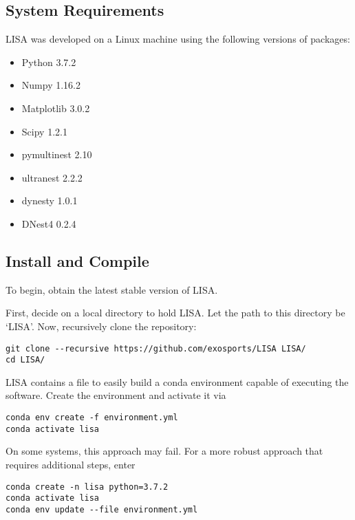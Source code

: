 \documentclass[letterpaper, 12pt]{article}
\begin{document}
\subsection{System Requirements}
\label{sec:requirements}

\noindent LISA was developed on a Linux machine using the following 
versions of packages:

\begin{itemize}
\item Python 3.7.2
\item Numpy 1.16.2
\item Matplotlib 3.0.2
\item Scipy 1.2.1
\item pymultinest 2.10
\item ultranest 2.2.2
\item dynesty 1.0.1
\item DNest4 0.2.4
\end{itemize}


\subsection{Install and Compile}
\label{sec:install}

\noindent To begin, obtain the latest stable version of LISA.  \newline

\noindent First, decide on a local directory to hold LISA.  Let the path to this 
directory be `LISA'.  Now, recursively clone the repository:
\begin{verbatim}
git clone --recursive https://github.com/exosports/LISA LISA/
cd LISA/
\end{verbatim}

\noindent LISA contains a file to easily build a conda environment capable of 
executing the software.  Create the environment and activate it via

\begin{verbatim}
conda env create -f environment.yml
conda activate lisa
\end{verbatim}

\noindent On some systems, this approach may fail.  For a more robust approach that 
requires additional steps, enter

\begin{verbatim}
conda create -n lisa python=3.7.2
conda activate lisa
conda env update --file environment.yml
\end{verbatim}
\end{document}
